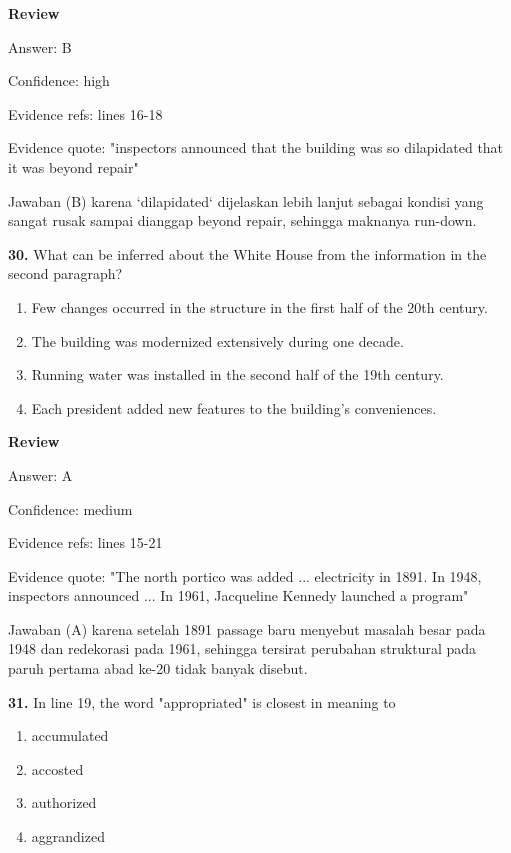 \documentclass[12pt]{article}
\begin{document}
\par
\begingroup
\setlength{\parskip}{0pt}
\setlength{\parindent}{0pt}
\textbf{Review}\par
Answer: B\par
Confidence: high\par
Evidence refs: lines 16-18\par
Evidence quote: "inspectors announced that the building was so dilapidated that it was beyond repair"\par
Jawaban (B) karena `dilapidated` dijelaskan lebih lanjut sebagai kondisi yang sangat rusak sampai dianggap beyond repair, sehingga maknanya run-down.\par
\endgroup
\par
\vspace{0.25\baselineskip}
\noindent\textbf{30.} What can be inferred about the White House from the information in the second paragraph?
\begin{enumerate}[label=(\Alph*),leftmargin=*,itemsep=0.2em]
\item Few changes occurred in the structure in the first half of the 20th century.
\item The building was modernized extensively during one decade.
\item Running water was installed in the second half of the 19th century.
\item Each president added new features to the building's conveniences.
\end{enumerate}
\par
\begingroup
\setlength{\parskip}{0pt}
\setlength{\parindent}{0pt}
\textbf{Review}\par
Answer: A\par
Confidence: medium\par
Evidence refs: lines 15-21\par
Evidence quote: "The north portico was added ... electricity in 1891. In 1948, inspectors announced ... In 1961, Jacqueline Kennedy launched a program"\par
Jawaban (A) karena setelah 1891 passage baru menyebut masalah besar pada 1948 dan redekorasi pada 1961, sehingga tersirat perubahan struktural pada paruh pertama abad ke-20 tidak banyak disebut.\par
\endgroup
\par
\vspace{0.25\baselineskip}
\noindent\textbf{31.} In line 19, the word "appropriated" is closest in meaning to
\begin{enumerate}[label=(\Alph*),leftmargin=*,itemsep=0.2em]
\item accumulated
\item accosted
\item authorized
\item aggrandized
\end{enumerate}
\end{document}
